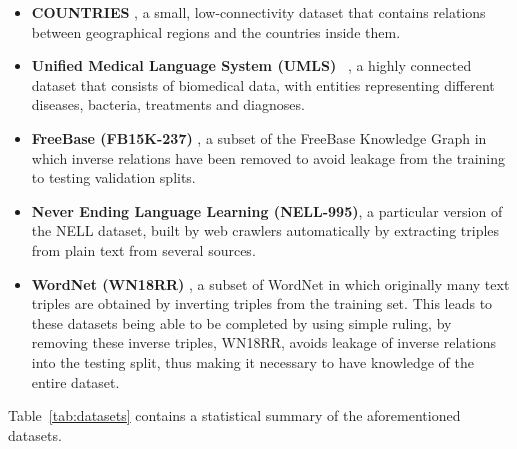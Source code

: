 \begin{itemize}
    \item \textbf{COUNTRIES} \cite{bouchard2015approximate}, a small, low-connectivity dataset that contains relations between geographical regions and the countries inside them.
    
    \item \textbf{Unified Medical Language System (UMLS)} ~\cite{kok2007statistical}, a highly connected dataset that consists of biomedical data, with entities representing different diseases, bacteria, treatments and diagnoses.
    
    \item \textbf{FreeBase (FB15K-237)} \cite{toutanova2015representing}, a subset of the FreeBase Knowledge Graph in which inverse relations have been removed to avoid leakage from the training to testing validation splits.
    
    \item \textbf{Never Ending Language Learning (NELL-995)}\cite{xiong2017deeppath}, a particular version of the NELL dataset, built by web crawlers automatically by extracting triples from plain text from several sources.
    
    \item \textbf{WordNet (WN18RR)} \cite{miller1995wordnet}, a subset of WordNet in which originally many text triples are obtained by inverting triples from the training set. \cite{dettmers2018convolutional}
    This leads to these datasets being able to be completed by using simple ruling, by removing these inverse triples, WN18RR, avoids leakage of inverse relations into the testing split, thus making it necessary to have knowledge of the entire dataset.
\end{itemize}

Table~\ref{tab:datasets} contains a statistical summary of the aforementioned datasets.




